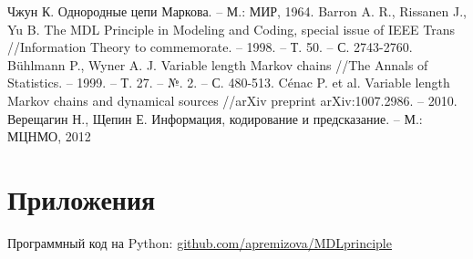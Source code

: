 \documentclass[12pt]{article}
\begin{document}

	

	
	\newpage
	\begin{thebibliography}{9}
	Чжун К. Однородные цепи Маркова. -- М.: МИР, 1964.
	Barron A. R., Rissanen J., Yu B. The MDL Principle in Modeling and Coding, special issue of IEEE Trans //Information Theory to commemorate. -- 1998. -- Т. 50. -- С. 2743-2760.
	Bühlmann P., Wyner A. J. Variable length Markov chains //The Annals of Statistics. -- 1999. -- Т. 27. -- №. 2. -- С. 480-513.
	Cénac P. et al. Variable length Markov chains and dynamical sources //arXiv preprint arXiv:1007.2986. -- 2010.
	Верещагин Н., Щепин Е. Информация, кодирование и предсказание. -- М.: МЦНМО, 2012 \end{thebibliography}

	\newpage
	\section{Приложения}
	Программный код на Python: \href{https://github.com/apremizova/MDLprinciple}{github.com/apremizova/MDLprinciple}
\end{document}
